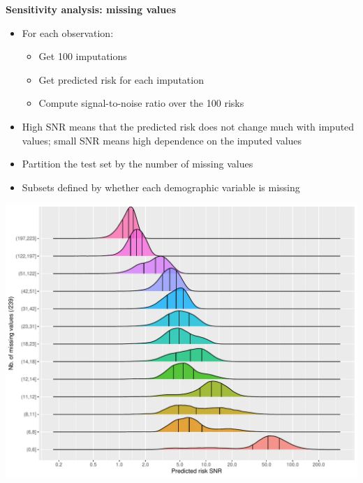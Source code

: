 \documentclass[12pt]{article}
\begin{document}
\newpage
\textbf{Sensitivity analysis: missing values}
\begin{itemize}
	\item For each observation:
	\begin{itemize}
		\item Get 100 imputations
		\item Get predicted risk for each imputation
		\item Compute signal-to-noise ratio over the 100 risks
	\end{itemize}
	\item High SNR means that the predicted risk does not change much 
	with imputed values; small SNR means high dependence on the imputed values
	\item Partition the test set by the number of missing values
	\item Subsets defined by whether each demographic variable is missing
\end{itemize}


\begin{center}
\includegraphics[width=\textwidth]{sensitivity_missing/nb_missing_values.pdf}
\end{center}
\end{document}
